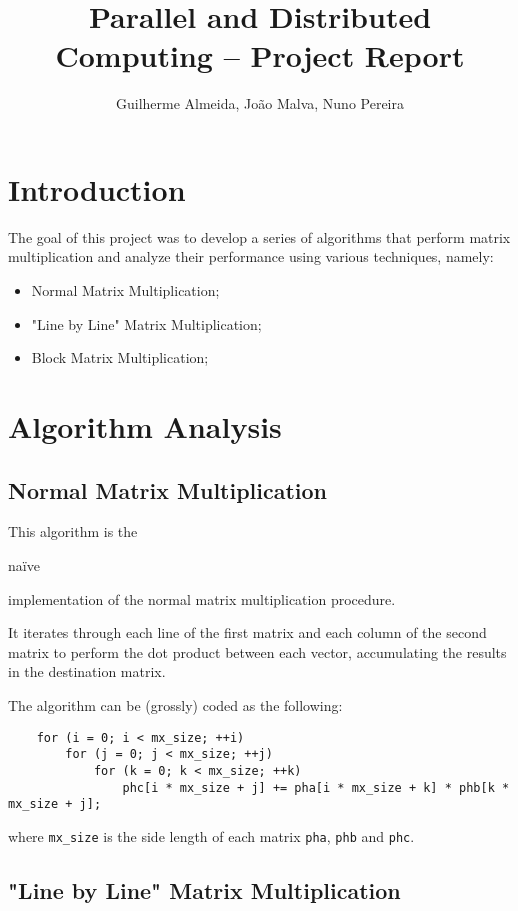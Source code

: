 \documentclass[11pt,a4paper]{article}
\title{Parallel and Distributed Computing -- \nth{1} Project Report}
\author{Guilherme Almeida, João Malva, Nuno Pereira}
\begin{document}
\maketitle

\section{Introduction}

The goal of this project was to develop a series of algorithms that perform matrix multiplication and analyze their performance using various techniques, namely:

\begin{itemize}
    \item Normal Matrix Multiplication;
    \item "Line by Line" Matrix Multiplication;
    \item Block Matrix Multiplication;
\end{itemize}

\section{Algorithm Analysis}

\subsection{Normal Matrix Multiplication}

This algorithm is the \begin{em}naïve\end{em} implementation of the normal matrix multiplication procedure.

It iterates through each line of the first matrix and each column of the second matrix to perform the dot product between each vector, accumulating the results in the destination matrix.

The algorithm can be (grossly) coded as the following:
\begin{lstlisting}
    for (i = 0; i < mx_size; ++i)
        for (j = 0; j < mx_size; ++j)
            for (k = 0; k < mx_size; ++k)
                phc[i * mx_size + j] += pha[i * mx_size + k] * phb[k * mx_size + j];
\end{lstlisting}
where \lstinline{mx_size} is the side length of each matrix \lstinline{pha}, \lstinline{phb} and \lstinline{phc}.

\subsection{"Line by Line" Matrix Multiplication}
\end{document}
